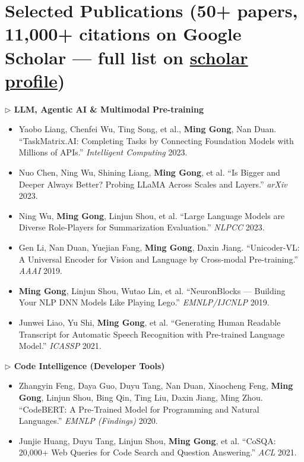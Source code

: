 \documentclass[10.5pt,letterpaper]{article}
\begin{document}
\section*{Selected Publications (50+ papers, 11{,}000+ citations on Google Scholar --- full list on \href{https://scholar.google.com/citations?user=c7JEFwsAAAAJ}{scholar profile})}

\noindent\textcolor{blue!60!black}{\textbf{$\triangleright$ LLM, Agentic AI \& Multimodal Pre-training}}
\begin{itemize}
  \item Yaobo Liang, Chenfei Wu, Ting Song, et al., \textbf{Ming Gong}, Nan Duan. ``TaskMatrix.AI: Completing Tasks by Connecting Foundation Models with Millions of APIs.'' \textit{Intelligent Computing} 2023.
  \item Nuo Chen, Ning Wu, Shining Liang, \textbf{Ming Gong}, et al. ``Is Bigger and Deeper Always Better? Probing LLaMA Across Scales and Layers.'' \textit{arXiv} 2023.
  \item Ning Wu, \textbf{Ming Gong}, Linjun Shou, et al. ``Large Language Models are Diverse Role-Players for Summarization Evaluation.'' \textit{NLPCC} 2023.
  \item Gen Li, Nan Duan, Yuejian Fang, \textbf{Ming Gong}, Daxin Jiang. ``Unicoder-VL: A Universal Encoder for Vision and Language by Cross-modal Pre-training.'' \textit{AAAI} 2019.
  \item \textbf{Ming Gong}, Linjun Shou, Wutao Lin, et al. ``NeuronBlocks --- Building Your NLP DNN Models Like Playing Lego.'' \textit{EMNLP/IJCNLP} 2019.
  \item Junwei Liao, Yu Shi, \textbf{Ming Gong}, et al. ``Generating Human Readable Transcript for Automatic Speech Recognition with Pre-trained Language Model.'' \textit{ICASSP} 2021.
\end{itemize}

\noindent\textcolor{blue!60!black}{\textbf{$\triangleright$ Code Intelligence (Developer Tools)}}
\begin{itemize}
  \item Zhangyin Feng, Daya Guo, Duyu Tang, Nan Duan, Xiaocheng Feng, \textbf{Ming Gong}, Linjun Shou, Bing Qin, Ting Liu, Daxin Jiang, Ming Zhou. ``CodeBERT: A Pre-Trained Model for Programming and Natural Languages.'' \textit{EMNLP (Findings)} 2020.
  \item Junjie Huang, Duyu Tang, Linjun Shou, \textbf{Ming Gong}, et al. ``CoSQA: 20,000+ Web Queries for Code Search and Question Answering.'' \textit{ACL} 2021.
\end{itemize}
\end{document}

